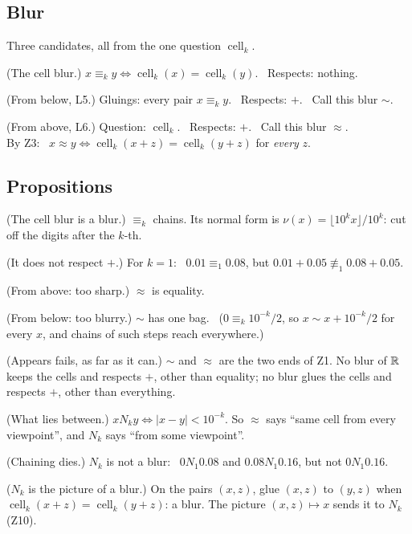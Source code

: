 \subsection*{Blur}

Three candidates, all from the one question $\operatorname{cell}_k$.
\begin{lines}
\item[\lab{B0}] (The cell blur.) $x \equiv_k y \iff \operatorname{cell}_k(x) = \operatorname{cell}_k(y)$. \ Respects: nothing.
\item[\lab{B1}] (From below, L5.) Gluings: every pair $x \equiv_k y$. \ Respects: $+$. \ Call this blur $\sim$.
\item[\lab{B2}] (From above, L6.) Question: $\operatorname{cell}_k$. \ Respects: $+$. \ Call this blur $\approx$. \\
By Z3: \ $x \approx y \iff \operatorname{cell}_k(x + z) = \operatorname{cell}_k(y + z)$ for \emph{every} $z$.
\end{lines}

\subsection*{Propositions}

\begin{lines}
\item[\lab{P1}] (The cell blur is a blur.) $\equiv_k$ chains. Its normal form is $\nu(x) = \lfloor 10^k x \rfloor / 10^k$: cut off the digits after the $k$-th.
\item[\lab{P2}] (It does not respect $+$.) For $k = 1$: \ $0.01 \equiv_1 0.08$, but $0.01 + 0.05 \not\equiv_1 0.08 + 0.05$.
\item[\lab{P3}] (From above: too sharp.) $\approx$ is equality.
\item[\lab{P4}] (From below: too blurry.) $\sim$ has one bag. \ ($0 \equiv_k 10^{-k}/2$, so $x \sim x + 10^{-k}/2$ for every $x$, and chains of such steps reach everywhere.)
\item[\lab{P5}] (Appears fails, as far as it can.) $\sim$ and $\approx$ are the two ends of Z1. No blur of $\mathbb{R}$ keeps the cells and respects $+$, other than equality; no blur glues the cells and respects $+$, other than everything.
\item[\lab{P6}] (What lies between.) $x \mathrel{N_k} y \iff |x - y| < 10^{-k}$. So $\approx$ says ``same cell from every viewpoint'', and $N_k$ says ``from some viewpoint''.
\item[\lab{P7}] (Chaining dies.) $N_k$ is not a blur: \ $0 \mathrel{N_1} 0.08$ and $0.08 \mathrel{N_1} 0.16$, but not $0 \mathrel{N_1} 0.16$.
\item[\lab{P8}] ($N_k$ is the picture of a blur.) On the pairs $(x, z)$, glue $(x, z)$ to $(y, z)$ when $\operatorname{cell}_k(x + z) = \operatorname{cell}_k(y + z)$: a blur. The picture $(x, z) \mapsto x$ sends it to $N_k$ (Z10).
\end{lines}

